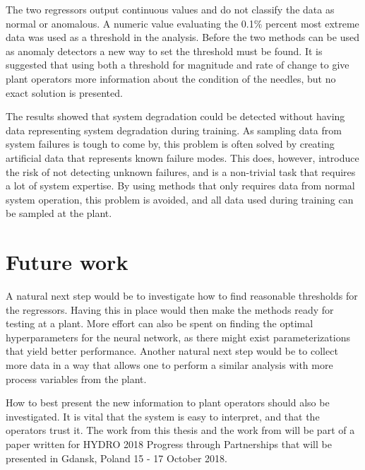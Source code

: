     The two regressors output continuous values and do not classify the data as normal or anomalous. A numeric value evaluating the 0.1\% percent most extreme data was used as a threshold in the analysis. Before the two methods can be used as anomaly detectors a new way to set the threshold must be found. It is suggested that using both a threshold for magnitude and rate of change to give plant operators more information about the condition of the needles, but no exact solution is presented. 
    
    The results showed that system degradation could be detected without having data representing system degradation during training. As sampling data from system failures is tough to come by, this problem is often solved by creating artificial data that represents known failure modes. This does, however, introduce the risk of not detecting unknown failures, and is a non-trivial task that requires a lot of system expertise. By using methods that only requires data from normal system operation, this problem is avoided, and all data used during training can be sampled at the plant. 
    
    
    
\section{Future work}
    A natural next step would be to investigate how to find reasonable thresholds for the regressors. Having this in place would then make the methods ready for testing at a plant. More effort can also be spent on finding the optimal hyperparameters for the neural network, as there might exist parameterizations that yield better performance. Another natural next step would be to collect more data in a way that allows one to perform a similar analysis with more process variables from the plant.

    How to best present the new information to plant operators should also be investigated. It is vital that the system is easy to interpret, and that the operators trust it. The work from this thesis and the work from \cite{Aasnes2017} will be part of a paper written for HYDRO 2018 Progress through Partnerships that will be presented in Gdansk, Poland 15 - 17 October 2018. 

    
    
    
       